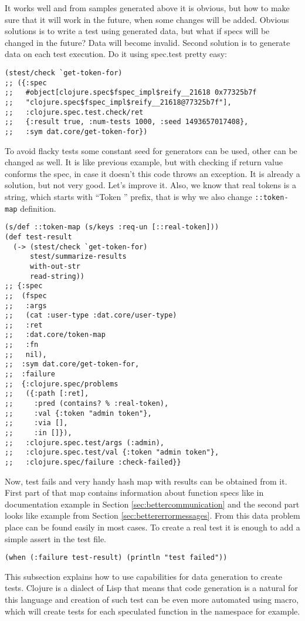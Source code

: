 It works well and from samples generated above it is obvious, but how to make
sure that it will work in the future, when some changes will be added. Obvious
solutions is to write a test using generated data, but what if specs will be
changed in the future? Data will become invalid. Second solution is to generate
data on each test execution. Do it using spec.test pretty easy:

\begin{verbatim}
(stest/check `get-token-for)
;; ({:spec
;;   #object[clojure.spec$fspec_impl$reify__21618 0x77325b7f
;;   "clojure.spec$fspec_impl$reify__21618@77325b7f"],
;;   :clojure.spec.test.check/ret
;;   {:result true, :num-tests 1000, :seed 1493657017408},
;;   :sym dat.core/get-token-for})
\end{verbatim}

To avoid flacky tests some constant seed for generators can be used, other can
be changed as well. It is like previous example, but with checking if return
value conforms the spec, in case it doesn't this code throws an exception. It is
already a solution, but not very good. Let's improve it. Also, we know that real
tokens is a string, which starts with ``Token '' prefix, that is why we also
change \texttt{::token-map} definition.

\begin{verbatim}
(s/def ::token-map (s/keys :req-un [::real-token]))
(def test-result
  (-> (stest/check `get-token-for)
      stest/summarize-results
      with-out-str
      read-string))
;; {:spec
;;  (fspec
;;   :args
;;   (cat :user-type :dat.core/user-type)
;;   :ret
;;   :dat.core/token-map
;;   :fn
;;   nil),
;;  :sym dat.core/get-token-for,
;;  :failure
;;  {:clojure.spec/problems
;;   ({:path [:ret],
;;     :pred (contains? % :real-token),
;;     :val {:token "admin token"},
;;     :via [],
;;     :in []}),
;;   :clojure.spec.test/args (:admin),
;;   :clojure.spec.test/val {:token "admin token"},
;;   :clojure.spec/failure :check-failed}}
\end{verbatim}

Now, test fails and very handy hash map with results can be obtained from it.
First part of that map contains information about function specs like in
documentation example in Section \ref{sec:bettercommunication} and the second
part looks like example from Section \ref{sec:bettererrormessages}. From this
data problem place can be found easily in most cases. To create a real test it
is enough to add a simple assert in the test file.

\begin{verbatim}
(when (:failure test-result) (println "test failed"))
\end{verbatim}

This subsection explains how to use capabilities for data generation to create
tests. Clojure is a dialect of Lisp that means that code generation is a natural
for this language and creation of such test can be even more automated using
macro, which will create tests for each speculated function in the namespace for
example.

